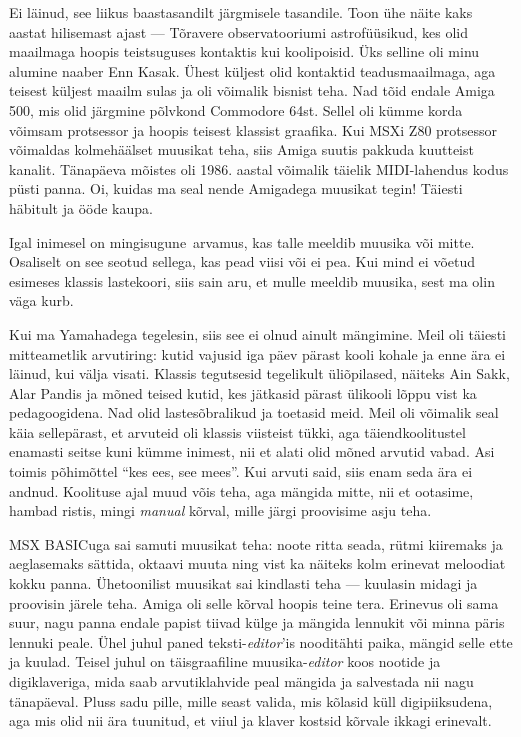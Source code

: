Ei läinud, see liikus baastasandilt järgmisele tasandile. Toon ühe näite kaks aastat hilisemast ajast --- Tõravere observatooriumi 
astrofüüsikud, kes olid maailmaga hoopis teistsuguses kontaktis kui 
koolipoisid. Üks selline oli minu alumine naaber Enn 
Kasak. Ühest küljest olid kontaktid 
teadusmaailmaga, aga teisest küljest maailm sulas ja oli 
võimalik bisnist teha. Nad tõid endale Amiga 
500, mis olid 
järgmine põlvkond Commodore 64st. Sellel oli kümme 
korda võimsam protsessor ja hoopis teisest klassist graafika. 
Kui MSXi Z80 protsessor võimaldas kolmehäälset muusikat teha, siis Amiga 
suutis pakkuda kuutteist kanalit. Tänapäeva mõistes oli 1986. aastal võimalik täielik MIDI-lahendus kodus püsti panna. Oi, kuidas 
ma seal nende Amigadega muusikat tegin! Täiesti häbitult ja ööde kaupa.


Igal inimesel on mingisugune arvamus, kas talle meeldib muusika või mitte. Osaliselt on see seotud sellega, 
kas pead viisi või ei pea. Kui mind ei võetud esimeses klassis lastekoori, siis sain aru, et mulle meeldib muusika, sest ma olin väga kurb. 

Kui ma Yamahadega tegelesin, siis see ei olnud ainult mängimine. 
Meil oli täiesti mitteametlik arvutiring: 
kutid vajusid iga päev pärast kooli kohale ja enne ära ei läinud, kui välja 
visati. Klassis tegutsesid tegelikult 
üliõpilased, näiteks Ain Sakk, Alar Pandis ja mõned teised kutid, kes jätkasid pärast ülikooli lõppu vist ka pedagoogidena. Nad olid lastesõbralikud ja toetasid meid. Meil oli võimalik seal käia sellepärast, et
arvuteid oli klassis viisteist tükki, aga 
täiendkoolitustel enamasti seitse kuni kümme inimest, nii et 
alati olid mõned arvutid vabad. Asi toimis põhimõttel \enquote{kes ees, see mees}. Kui arvuti said, siis enam seda ära ei 
andnud. Koolituse ajal muud võis teha, aga mängida mitte, nii et ootasime, hambad ristis, mingi \emph{manual} 
kõrval, mille järgi proovisime asju teha. 

MSX BASICuga sai samuti muusikat teha: noote ritta seada, 
rütmi kiiremaks ja aeglasemaks sättida, oktaavi muuta ning vist ka näiteks 
kolm erinevat meloodiat kokku panna. Ühetoonilist muusikat sai 
kindlasti teha --- kuulasin midagi ja proovisin 
järele teha. Amiga oli selle kõrval hoopis teine tera.
Erinevus oli sama suur, nagu panna endale papist 
tiivad külge ja mängida lennukit või minna päris lennuki peale. 
Ühel juhul paned teksti-\emph{editor}'is nooditähti paika, mängid selle ette ja kuulad. Teisel juhul on täisgraafiline muusika-\emph{editor} koos nootide ja digiklaveriga, mida saab arvutiklahvide peal mängida ja salvestada nii nagu tänapäeval. Pluss sadu pille, mille seast valida, mis 
kõlasid küll digipiiksudena, aga mis olid nii ära tuunitud, et viiul ja klaver kostsid kõrvale ikkagi erinevalt.

